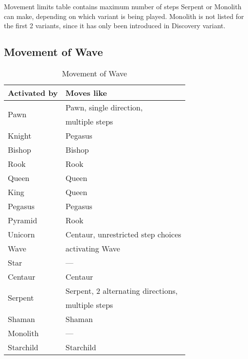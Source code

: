 Movement limits table contains maximum number of steps Serpent or Monolith can make,
depending on which variant is being played. Monolith is not listed for the first 2
variants, since it has only been introduced in Discovery variant.

\clearpage %

\subsection*{Movement of Wave}
\label{sec:Appendix/Movement of Wave}

\begin{table}[!h]
\centering
\begin{tabular}{ ll }
\toprule
\textbf{Activated by}       & \textbf{Moves like}                       \\
\midrule
\multirow{2}{*}{Pawn}       & Pawn, single direction,                   \\
                            & multiple steps                            \\ \cmidrule{1-2}
Knight                      & Pegasus                                   \\
Bishop                      & Bishop                                    \\
Rook                        & Rook                                      \\
Queen                       & Queen                                     \\
King                        & Queen                                     \\ \cmidrule{1-2}
Pegasus                     & Pegasus                                   \\
Pyramid                     & Rook                                      \\
Unicorn                     & Centaur, unrestricted step choices        \\
Wave                        & activating Wave                           \\
Star                        & ---                                       \\
Centaur                     & Centaur                                   \\\cmidrule{1-2}
\multirow{2}{*}{Serpent}    & Serpent, 2 alternating directions,        \\
                            & multiple steps                            \\\cmidrule{1-2}
Shaman                      & Shaman                                    \\
Monolith                    & ---                                       \\
Starchild                   & Starchild                                 \\
\bottomrule
\end{tabular}
\caption{Movement of Wave}
\label{tbl:Appendix/Movement of Wave}
\end{table}

